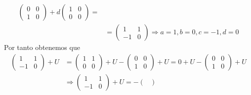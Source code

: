 \documentclass[12pt]{article}
\begin{document}
\begin{enumerate}
\begin{enumerate}
\begin{align*}
\begin{pmatrix}
				                                                0 & 0 \\
				                                                1 & 0
			                                                \end{pmatrix}+d\begin{pmatrix}
				                                                               1 & 0 \\
				                                                               0 & 0
			                                                               \end{pmatrix} = \\&= \begin{pmatrix}
				            1  & 1 \\
				            -1 & 0
			            \end{pmatrix} \Rightarrow a=1,b=0,c=-1, d = 0
		            \end{align*}
		            Por tanto obtenemos que
		            \begin{align*}
			            \begin{pmatrix}
				            1  & 1 \\
				            -1 & 0
			            \end{pmatrix} + U & = \begin{pmatrix}
				                                  1 & 1 \\
				                                  0 & 0
			                                  \end{pmatrix} + U - \begin{pmatrix}
				                                                      0 & 0 \\
				                                                      1 & 0
			                                                      \end{pmatrix} + U = 0 + U - \begin{pmatrix}
				                                                                                  0 & 0 \\
				                                                                                  1 & 0
			                                                                                  \end{pmatrix} + U \\&\Rightarrow \begin{pmatrix}
				            1  & 1 \\
				            -1 & 0
			            \end{pmatrix} + U = - \begin{pmatrix}

\end{pmatrix}
\end{align*}
\end{enumerate}
\end{enumerate}
\end{document}
